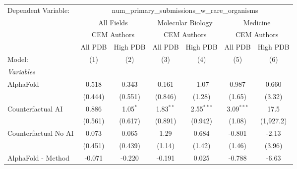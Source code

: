 \begingroup
\centering
\begin{tabular}{lcccccc}
   \tabularnewline \midrule \midrule
   Dependent Variable: & \multicolumn{6}{c}{num\_primary\_submissions\_w\_rare\_organisms}\\
 & \multicolumn{2}{c}{All Fields} & \multicolumn{2}{c}{Molecular Biology} & \multicolumn{2}{c}{Medicine} \\
\cmidrule(lr){2-3} \cmidrule(lr){4-5} \cmidrule(lr){6-7}
 & \multicolumn{2}{c}{CEM Authors} & \multicolumn{2}{c}{CEM Authors} & \multicolumn{2}{c}{CEM Authors} \\
\cmidrule(lr){2-3} \cmidrule(lr){4-5} \cmidrule(lr){6-7}
 & \multicolumn{1}{c}{All PDB} & \multicolumn{1}{c}{High PDB} & \multicolumn{1}{c}{All PDB} & \multicolumn{1}{c}{High PDB} & \multicolumn{1}{c}{All PDB} & \multicolumn{1}{c}{High PDB} \\
\cmidrule(lr){2-2} \cmidrule(lr){3-3} \cmidrule(lr){4-4} \cmidrule(lr){5-5} \cmidrule(lr){6-6} \cmidrule(lr){7-7}
   Model:                                                     & (1)          & (2)           & (3)           & (4)           & (5)          & (6)\\  
   \midrule
   \emph{Variables}\\
   AlphaFold                                                  & 0.518        & 0.343         & 0.161         & -1.07         & 0.987        & 0.660\\   
                                                              & (0.444)      & (0.551)       & (0.846)       & (1.28)        & (1.65)       & (3.32)\\   
   Counterfactual AI                                          & 0.886        & 1.05$^{*}$    & 1.83$^{**}$   & 2.55$^{***}$  & 3.09$^{***}$ & 17.5\\   
                                                              & (0.561)      & (0.617)       & (0.891)       & (0.942)       & (1.08)       & (1,927.2)\\   
   Counterfactual No AI                                       & 0.073        & 0.065         & 1.29          & 0.684         & -0.801       & -2.13\\   
                                                              & (0.451)      & (0.439)       & (1.14)        & (1.42)        & (1.46)       & (3.96)\\   
   AlphaFold - Method                                         & -0.071       & -0.220        & -0.191        & 0.025         & -0.788       & -6.63\\   

\end{tabular}
